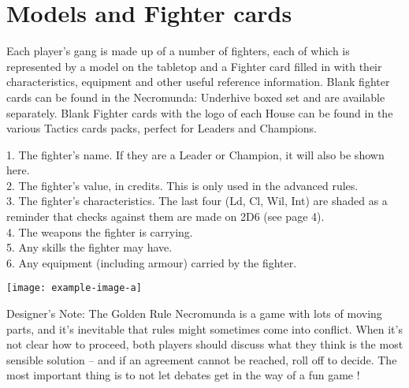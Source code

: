 \section{Models and Fighter cards}
Each player’s gang is made up of a number of fighters, each of which is represented by a model on the tabletop and a
Fighter card filled in with their characteristics, equipment and other useful reference information. Blank fighter
cards can be found in the Necromunda: Underhive boxed set and are available separately. Blank Fighter cards with the
logo of each House can be found in the various Tactics cards packs, perfect for Leaders and Champions.



\begin{dndtable}
  1. The fighter’s name. If they are a Leader or Champion, it will also be shown here. \\
  2. The fighter’s value, in credits. This is only used in the advanced rules. \\
  3. The fighter’s characteristics. The last four (Ld, Cl, Wil, Int) are shaded as a reminder that checks against them are
  made on 2D6 (see page 4). \\
  4. The weapons the fighter is carrying. \\
  5. Any skills the fighter may have. \\
  6. Any equipment (including armour) carried by the fighter.\\
\end{dndtable}

\texttt{[image: example-image-a]}

\begin{paperbox}{Designer’s Note: The Golden Rule}
  Necromunda is a game with lots of moving parts, and it’s inevitable that rules might sometimes come into conflict.
  When it’s not clear how to proceed, both players should discuss what they think is the most sensible solution – and if
  an agreement cannot be reached, roll off to decide. The most important thing is to not let debates get in the way of
  a fun game !
\end{paperbox}





















